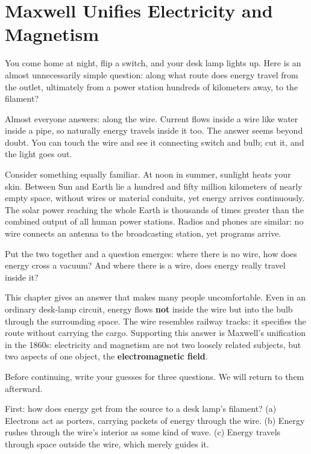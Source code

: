 \chapter{Maxwell Unifies Electricity and Magnetism}


You come home at night, flip a switch, and your desk lamp lights up. Here is an almost unnecessarily simple question: along what route does energy travel from the outlet, ultimately from a power station hundreds of kilometers away, to the filament?

Almost everyone answers: along the wire. Current flows inside a wire like water inside a pipe, so naturally energy travels inside it too. The answer seems beyond doubt. You can touch the wire and see it connecting switch and bulb; cut it, and the light goes out.

Consider something equally familiar. At noon in summer, sunlight heats your skin. Between Sun and Earth lie a hundred and fifty million kilometers of nearly empty space, without wires or material conduits, yet energy arrives continuously. The solar power reaching the whole Earth is thousands of times greater than the combined output of all human power stations. Radios and phones are similar: no wire connects an antenna to the broadcasting station, yet programs arrive.

Put the two together and a question emerges: where there is no wire, how does energy cross a vacuum? And where there is a wire, does energy really travel inside it?

This chapter gives an answer that makes many people uncomfortable. Even in an ordinary desk-lamp circuit, energy flows \textbf{not} inside the wire but into the bulb through the surrounding space. The wire resembles railway tracks: it specifies the route without carrying the cargo. Supporting this answer is Maxwell's unification in the 1860s: electricity and magnetism are not two loosely related subjects, but two aspects of one object, the \textbf{electromagnetic field}.


Before continuing, write your guesses for three questions. We will return to them afterward.

First: how does energy get from the source to a desk lamp's filament? (a) Electrons act as porters, carrying packets of energy through the wire. (b) Energy rushes through the wire's interior as some kind of wave. (c) Energy travels through space outside the wire, which merely guides it.

